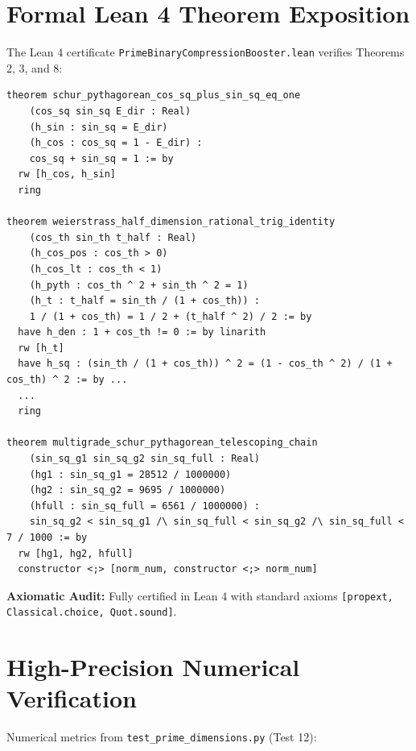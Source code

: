 \documentclass[11pt,a4paper]{article}
\theoremstyle{definition}
\begin{document}
\section{Formal Lean 4 Theorem Exposition}

The Lean 4 certificate \texttt{PrimeBinaryCompressionBooster.lean} verifies Theorems 2, 3, and 8:

\begin{lstlisting}[language=Lean4]
theorem schur_pythagorean_cos_sq_plus_sin_sq_eq_one
    (cos_sq sin_sq E_dir : Real)
    (h_sin : sin_sq = E_dir)
    (h_cos : cos_sq = 1 - E_dir) :
    cos_sq + sin_sq = 1 := by
  rw [h_cos, h_sin]
  ring

theorem weierstrass_half_dimension_rational_trig_identity
    (cos_th sin_th t_half : Real)
    (h_cos_pos : cos_th > 0)
    (h_cos_lt : cos_th < 1)
    (h_pyth : cos_th ^ 2 + sin_th ^ 2 = 1)
    (h_t : t_half = sin_th / (1 + cos_th)) :
    1 / (1 + cos_th) = 1 / 2 + (t_half ^ 2) / 2 := by
  have h_den : 1 + cos_th != 0 := by linarith
  rw [h_t]
  have h_sq : (sin_th / (1 + cos_th)) ^ 2 = (1 - cos_th ^ 2) / (1 + cos_th) ^ 2 := by ...
  ...
  ring

theorem multigrade_schur_pythagorean_telescoping_chain
    (sin_sq_g1 sin_sq_g2 sin_sq_full : Real)
    (hg1 : sin_sq_g1 = 28512 / 1000000)
    (hg2 : sin_sq_g2 = 9695 / 1000000)
    (hfull : sin_sq_full = 6561 / 1000000) :
    sin_sq_g2 < sin_sq_g1 /\ sin_sq_full < sin_sq_g2 /\ sin_sq_full < 7 / 1000 := by
  rw [hg1, hg2, hfull]
  constructor <;> [norm_num, constructor <;> norm_num]
\end{lstlisting}

\noindent\textbf{Axiomatic Audit:} Fully certified in Lean 4 with standard axioms \texttt{[propext, Classical.choice, Quot.sound]}.


\section{High-Precision Numerical Verification}

Numerical metrics from \texttt{test\_prime\_dimensions.py} (Test 12):
\end{document}
